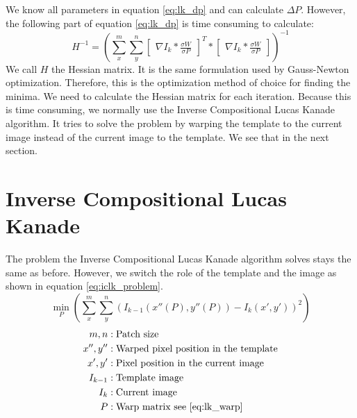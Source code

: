 \documentclass[11pt,a4paper,titlepage,oneside]{report}
\begin{document}
We know all parameters in equation \ref{eq:lk_dp} and can calculate $\Delta P$. However, the following part of equation \ref{eq:lk_dp} is time consuming to calculate:
\begin{equation}
  H^{-1}=(\sum_x^m\sum_y^n\begin{bmatrix}\nabla I_{k}*\frac{\sigma W}{\sigma P}\end{bmatrix}^T*\begin{bmatrix}\nabla I_{k}*\frac{\sigma W}{\sigma P}\end{bmatrix})^{-1}
\end{equation}
We call $H$ the Hessian matrix. It is the same formulation used by Gauss-Newton optimization. Therefore, this is the optimization method of choice for finding the minima. We need to calculate the Hessian matrix for each iteration. Because this is time consuming, we normally use the Inverse Compositional Lucas Kanade algorithm. It tries to solve the problem by warping the template to the current image instead of the current image to the template. We see that in the next section.

\section{Inverse Compositional Lucas Kanade}\label{sec:inv_comp_lk}
The problem the Inverse Compositional Lucas Kanade algorithm solves stays the same as before. However, we switch the role of the template and the image as shown in equation \ref{eq:iclk_problem}.
\begin{equation}\label{eq:iclk_problem}
  \min_P(\sum_x^m\sum_y^n(I_{k-1}(x''(P),y''(P))-I_{k}(x',y'))^2)
\end{equation}
\begin{align*}
  m,n        &: \text{Patch size}\\
  x'',y''    &: \text{Warped pixel position in the template}\\
  x',y'      &: \text{Pixel position in the current image}\\
  I_{k-1}    &: \text{Template image}\\
  I_{k}      &: \text{Current image}\\
  P          &: \text{Warp matrix see \ref{eq:lk_warp}}
\end{align*}
\end{document}
